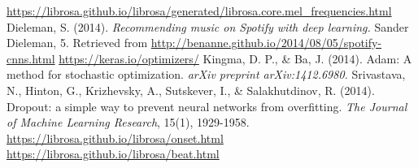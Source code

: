 \documentclass[12pt]{article}
\begin{document}
\begin{thebibliography}{99}
{}
{
    \href{https://librosa.github.io/librosa/generated/librosa.core.mel_frequencies.html}
    {https://librosa.github.io/librosa/generated/librosa.core.mel\_frequencies.html}
}
{
    Dieleman, S. (2014). 
    \textit{Recommending music on Spotify with deep learning.} 
    Sander Dieleman, 5.
    Retrieved from 
    \href{http://benanne.github.io/2014/08/05/spotify-cnns.html}
    {http://benanne.github.io/2014/08/05/spotify-cnns.html}
}
{
\href{https://keras.io/optimizers/}
{https://keras.io/optimizers/}
}
{
    Kingma, D. P., \& Ba, J. (2014). 
    Adam: A method for stochastic optimization. 
    \textit{arXiv preprint arXiv:1412.6980.}
}
{
    Srivastava, N., Hinton, G., Krizhevsky, A., 
    Sutskever, I., \& Salakhutdinov, R. (2014). 
    Dropout: a simple way to prevent neural networks from overfitting. 
    \textit{The Journal of Machine Learning Research}, 15(1), 1929-1958.
}
{
    \href{https://librosa.github.io/librosa/onset.html}
    {https://librosa.github.io/librosa/onset.html}
}
{
    \href{https://librosa.github.io/librosa/beat.html}
    {https://librosa.github.io/librosa/beat.html}
}
\end{thebibliography}
\end{document}
